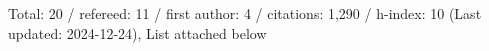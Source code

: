 Total: 20 / refereed: 11 / first author: 4 / citations: 1,290 / h-index: 10 (Last updated: 2024-12-24), List attached below